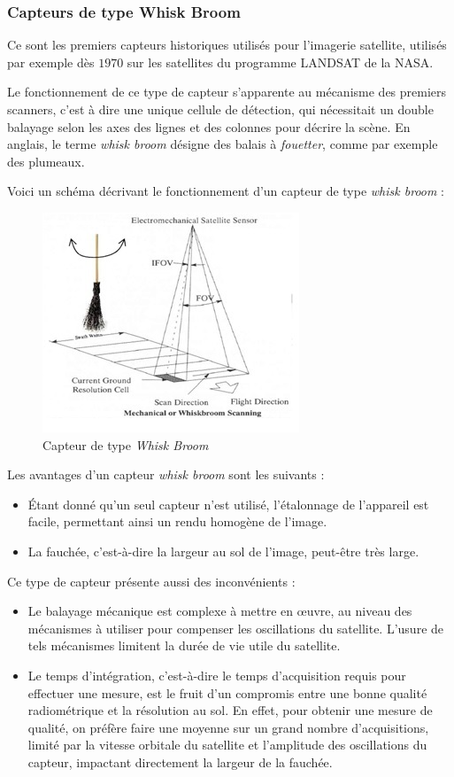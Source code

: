 \documentclass[a4paper, 10pt]{report}
\begin{document}
\subsubsection{Capteurs de type Whisk Broom}
Ce sont les premiers capteurs historiques utilisés pour l'imagerie satellite, utilisés par exemple dès $1970$ sur les satellites du programme LANDSAT de la NASA.

Le fonctionnement de ce type de capteur s'apparente au mécanisme des premiers scanners, c'est à dire une unique cellule de détection, qui nécessitait un double balayage selon les axes des lignes et des colonnes pour décrire la scène.
En anglais, le terme \emph{whisk broom} désigne des balais à \emph{fouetter}, comme par exemple des plumeaux.

Voici un schéma décrivant le fonctionnement d'un capteur de type \emph{whisk broom} :
\begin{figure}[H]
	\begin{center}
		\includegraphics[scale=0.7]{Images/Whisk_Broom.jpg}
		\caption{Capteur de type \emph{Whisk Broom}}
	\end{center}
\end{figure}
Les avantages d'un capteur \emph{whisk broom} sont les suivants :
\begin{itemize}
	\item Étant donné qu'un seul capteur n'est utilisé, l'étalonnage de l'appareil est facile, permettant ainsi un rendu homogène de l'image.
	\item La fauchée, c'est-à-dire la largeur au sol de l'image, peut-être très large.
\end{itemize}
Ce type de capteur présente aussi des inconvénients :
\begin{itemize}
	\item Le balayage mécanique est complexe à mettre en œuvre, au niveau des mécanismes à utiliser pour compenser les oscillations du satellite. L'usure de tels mécanismes limitent la durée de vie utile du satellite.
	\item Le temps d'intégration, c'est-à-dire le temps d'acquisition requis pour effectuer une mesure, est le fruit d'un compromis entre une bonne qualité radiométrique et la résolution au sol. En effet, pour obtenir une mesure de qualité, on préfère faire une moyenne sur un grand nombre d'acquisitions, limité par la vitesse orbitale du satellite et l'amplitude des oscillations du capteur, impactant directement la largeur de la fauchée.
\end{itemize}
\end{document}
